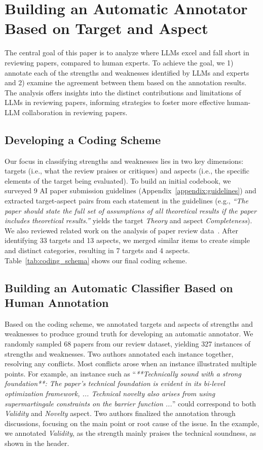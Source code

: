 \section {Building an Automatic Annotator Based on Target and Aspect}

The central goal of this paper is to analyze where LLMs excel and fall short in reviewing papers, compared to human experts. To achieve the goal, we 1) annotate each of the strengths and weaknesses identified by LLMs and experts and 2) examine the agreement between them based on the annotation results. The analysis offers insights into the distinct contributions and limitations of LLMs in reviewing papers, informing strategies to foster more effective human-LLM collaboration in reviewing papers.

\subsection{Developing a Coding Scheme}

Our focus in classifying strengths and weaknesses lies in two key dimensions: targets (i.e., what the review praises or critiques) and aspects (i.e., the specific elements of the target being evaluated). To build an initial codebook, we surveyed 9 AI paper submission guidelines (Appendix~\ref{appendix:guidelines}) and extracted target-aspect pairs from each statement in the guidelines (e.g., \textit{``The paper should state the full set of assumptions of all theoretical results if the paper includes theoretical results.''} yields the target \textit{Theory} and aspect \textit{Completeness}). We also reviewed related work on the analysis of paper review data~\citep{chakraborty2020aspect, ghosal2022peer, yuan2022can}. After identifying 33 targets and 13 aspects, we merged similar items to create simple and distinct categories, resulting in 7 targets and 4 aspects. Table~\ref{tab:coding_schema} shows our final coding scheme.

\subsection{Building an Automatic Classifier Based on Human Annotation}

Based on the coding scheme, we annotated targets and aspects of strengths and weaknesses to produce ground truth for developing an automatic annotator. We randomly sampled 68 papers from our review dataset, yielding 327 instances of strengths and weaknesses. Two authors annotated each instance together, resolving any conflicts. Most conflicts arose when an instance illustrated multiple points. For example, an instance such as ``\textit{**Technically sound with a strong foundation**: The paper's technical foundation is evident in its bi-level optimization framework, ... Technical novelty also arises from using supermartingale constraints on the barrier function ...}'' could correspond to both \textit{Validity} and \textit{Novelty} aspect. Two authors finalized the annotation through discussions, focusing on the main point or root cause of the issue. In the example, we annotated \textit{Validity}, as the strength mainly praises the technical soundness, as shown in the header.

